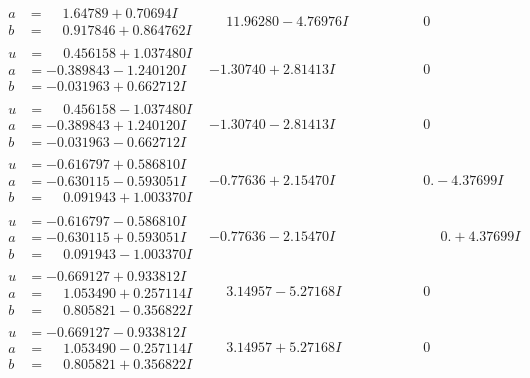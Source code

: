 \documentclass[1p]{elsarticle_modified}
\theoremstyle{definition}
\begin{document}
$$\begin{array}{c|c|c}
\begin{aligned}
a &= \phantom{-}1.64789 + 0.70694 I \\
b &= \phantom{-}0.917846 + 0.864762 I\end{aligned}
 & \phantom{-}11.96280 - 4.76976 I & \phantom{-0.000000 } 0 \\ \hline\begin{aligned}
u &= \phantom{-}0.456158 + 1.037480 I \\
a &= -0.389843 - 1.240120 I \\
b &= -0.031963 + 0.662712 I\end{aligned}
 & -1.30740 + 2.81413 I & \phantom{-0.000000 } 0 \\ \hline\begin{aligned}
u &= \phantom{-}0.456158 - 1.037480 I \\
a &= -0.389843 + 1.240120 I \\
b &= -0.031963 - 0.662712 I\end{aligned}
 & -1.30740 - 2.81413 I & \phantom{-0.000000 } 0 \\ \hline\begin{aligned}
u &= -0.616797 + 0.586810 I \\
a &= -0.630115 - 0.593051 I \\
b &= \phantom{-}0.091943 + 1.003370 I\end{aligned}
 & -0.77636 + 2.15470 I & \phantom{-0.000000 } 0. - 4.37699 I \\ \hline\begin{aligned}
u &= -0.616797 - 0.586810 I \\
a &= -0.630115 + 0.593051 I \\
b &= \phantom{-}0.091943 - 1.003370 I\end{aligned}
 & -0.77636 - 2.15470 I & \phantom{-0.000000 -}0. + 4.37699 I \\ \hline\begin{aligned}
u &= -0.669127 + 0.933812 I \\
a &= \phantom{-}1.053490 + 0.257114 I \\
b &= \phantom{-}0.805821 - 0.356822 I\end{aligned}
 & \phantom{-}3.14957 - 5.27168 I & \phantom{-0.000000 } 0 \\ \hline\begin{aligned}
u &= -0.669127 - 0.933812 I \\
a &= \phantom{-}1.053490 - 0.257114 I \\
b &= \phantom{-}0.805821 + 0.356822 I\end{aligned}
 & \phantom{-}3.14957 + 5.27168 I & \phantom{-0.000000 } 0\\

\end{array}$$
\end{document}
